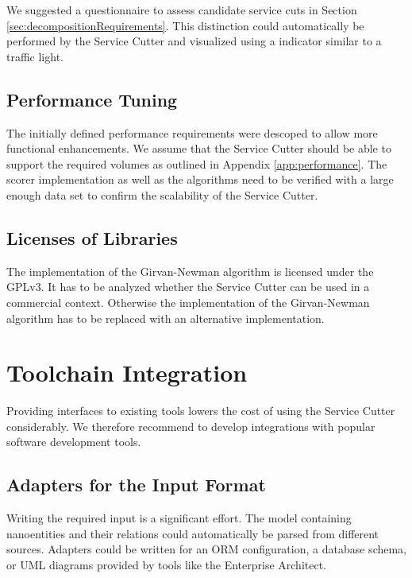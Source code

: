 We suggested a questionnaire to assess candidate service cuts in Section \ref{sec:decompositionRequirements}. This distinction could automatically be performed by the Service Cutter and visualized using a indicator similar to a traffic light.

\subsection{Performance Tuning}
\label{sec:future-tuning}

The initially defined performance requirements were descoped to allow more functional enhancements. We assume that the Service Cutter should be able to support the required volumes as outlined in Appendix \ref{app:performance}. The scorer implementation as well as the algorithms need to be verified with a large enough data set to confirm the scalability of the Service Cutter.

\subsection{Licenses of Libraries}
\label{sec:future-license}

The implementation of the Girvan-Newman algorithm\cite{girvanGephi} is licensed under the GPLv3. It has to be analyzed whether the Service Cutter can be used in a commercial context. Otherwise the implementation of the Girvan-Newman algorithm has to be replaced with an alternative implementation.

\section{Toolchain Integration}

Providing interfaces to existing tools lowers the cost of using the Service Cutter considerably. We therefore recommend to develop integrations with popular software development tools.

\subsection{Adapters for the Input Format}
\label{sec:input-adapters}

Writing the required input is a significant effort. The model containing nanoentities and their relations could automatically be parsed from different sources. Adapters could be written for an \gls{ORM} configuration, a database schema, or \gls{UML} diagrams provided by tools like the Enterprise Architect\cite{entArch}.

